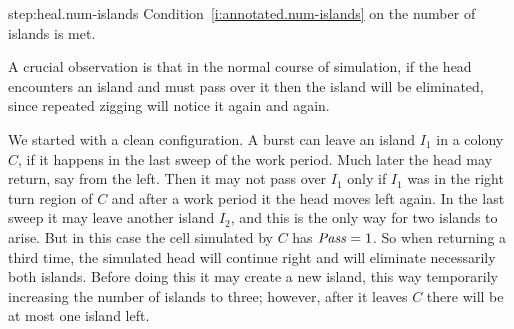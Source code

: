 \documentclass[11pt]{memoir}
\theoremstyle{definition} %
\newcommand{\fld}[1]{\ensuremath{\textit{#1\/}}}
\def\B{B}
\newcommand{\Q}{Q} %
\newcommand{\Pass}{\fld{Pass}} %
\begin{document}
\begin{Proof}


\begin{step+}{step:heal.num-islands}
  Condition~\eqref{i:annotated.num-islands} on the number of islands is met.
\end{step+}
\begin{pproof}
  A crucial observation is that in the normal course of simulation, if the head encounters an
  island and must pass over it then the island will be eliminated,
  since repeated zigging will notice it again and again.
  
  We started with a clean configuration.
  A burst can leave an island \( I_{1} \) in a colony \( C \), if it happens in the last
  sweep of the work period.
  Much later the head may return, say from the left.
  Then it may not pass over \( I_{1} \) only if \( I_{1} \) was in the right turn region of \( C \)
  and after a work period it the head moves left again.
  In the last sweep it may leave another island \( I_{2} \), and this is the only
  way for two islands to arise.
  But in this case the cell simulated by \( C \) has \( \Pass=1 \).
  So when returning a third time, 
  the simulated head will continue right and will eliminate necessarily both islands.
  Before doing this it may create a new island, this way temporarily increasing
  the number of islands to three; however, after it leaves \( C \) there will be at most
  one island left.
\end{pproof}


\end{Proof}
\end{document}
